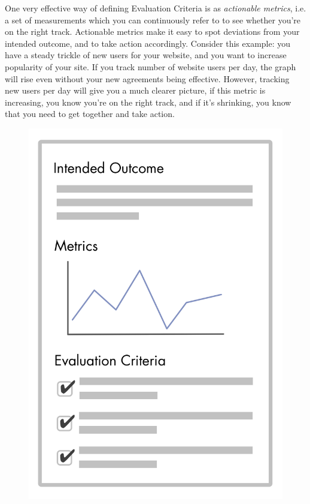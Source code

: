 One very effective way of defining Evaluation Criteria is as \emph{actionable metrics}, i.e. a set of measurements which you can continuously refer to to see whether you're on the right track. Actionable metrics make it easy to spot deviations from your intended outcome, and to take action accordingly. Consider this example: you have a steady trickle of new users for your website, and you want to increase popularity of your site. If you track number of website users per day, the graph will rise even without your new agreements being effective. However, tracking new users per day will give you a much clearer picture, if this metric is increasing, you know you're on the right track, and if it's shrinking, you know that you need to get together and take action.

\begin{figure}[htbp]
\centering
\includegraphics[keepaspectratio,width=\textwidth,height=0.75\textheight]{img/agreements/outcome-and-criteria.png}
\end{figure}


